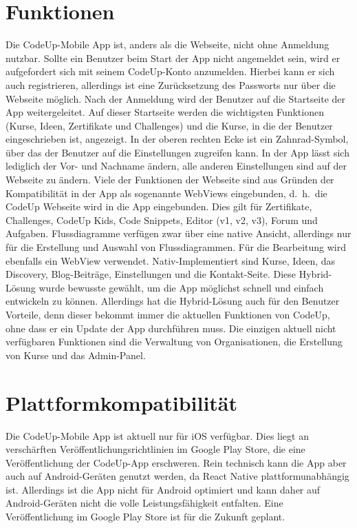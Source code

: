 \documentclass[main.tex]{subfiles}
\begin{document}
    \section{Funktionen}
    Die CodeUp-Mobile App ist, anders als die Webseite, nicht ohne Anmeldung nutzbar.
    Sollte ein Benutzer beim Start der App nicht angemeldet sein, wird er aufgefordert sich mit seinem CodeUp-Konto anzumelden.
    Hierbei kann er sich auch registrieren, allerdings ist eine Zurücksetzung des Passworts nur über die Webseite möglich.
    Nach der Anmeldung wird der Benutzer auf die Startseite der App weitergeleitet.
    Auf dieser Startseite werden die wichtigsten Funktionen (Kurse, Ideen, Zertifikate und Challenges) und die Kurse, in die der Benutzer eingeschrieben ist, angezeigt.
    In der oberen rechten Ecke ist ein Zahnrad-Symbol, über das der Benutzer auf die Einstellungen zugreifen kann.
    In der App lässt sich lediglich der Vor- und Nachname ändern, alle anderen Einstellungen sind auf der Webseite zu ändern.
    Viele der Funktionen der Webseite sind aus Gründen der Kompatibilität in der App als sogenannte WebViews eingebunden, d.~h.~die CodeUp Webseite wird in die App eingebunden.
    Dies gilt für Zertifikate, Challenges, CodeUp Kids, Code Snippets, Editor (v1, v2, v3), Forum und Aufgaben.
    Flussdiagramme verfügen zwar über eine native Ansicht, allerdings nur für die Erstellung und Auswahl von Flussdiagrammen.
    Für die Bearbeitung wird ebenfalls ein WebView verwendet.
    Nativ-Implementiert sind Kurse, Ideen, das Discovery, Blog-Beiträge, Einstellungen und die Kontakt-Seite.
    Diese Hybrid-Lösung wurde bewusste gewählt, um die App möglichst schnell und einfach entwickeln zu können.
    Allerdings hat die Hybrid-Lösung auch für den Benutzer Vorteile, denn dieser bekommt immer die aktuellen Funktionen von CodeUp, ohne dass er ein Update der App durchführen muss.
    Die einzigen aktuell nicht verfügbaren Funktionen sind die Verwaltung von Organisationen, die Erstellung von Kurse und das Admin-Panel.
    \section{Plattformkompatibilität}
    Die CodeUp-Mobile App ist aktuell nur für iOS verfügbar.
    Dies liegt an verschärften Veröffentlichungsrichtlinien im Google Play Store, die eine Veröffentlichung der CodeUp-App erschweren.
    Rein technisch kann die App aber auch auf Android-Geräten genutzt werden, da React Native plattformunabhängig ist.
    Allerdings ist die App nicht für Android optimiert und kann daher auf Android-Geräten nicht die volle Leistungsfähigkeit entfalten.
    Eine Veröffentlichung im Google Play Store ist für die Zukunft geplant.
\end{document}
